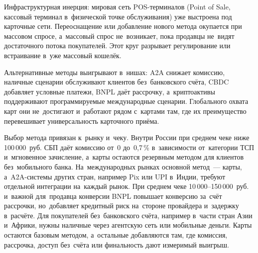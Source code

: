 Инфраструктурная инерция: мировая сеть POS-терминалов (Point of Sale, кассовый
терминал в~физической точке обслуживания) уже выстроена под карточные сети.
Переоснащение или добавление нового метода окупается при массовом спросе,
а~массовый спрос не~возникает, пока продавцы не~видят достаточного
потока покупателей. Этот круг разрывает регулирование или встраивание в~уже
массовый кошелёк.

Альтернативные методы выигрывают в~нишах: A2A снижает комиссию, наличные
сценарии обслуживают клиентов без~банковского счёта, CBDC добавляет условные
платежи, BNPL даёт рассрочку, а~криптоактивы поддерживают программируемые
международные сценарии. Глобального охвата карт они не~достигают и~работают
рядом с~картами там, где их преимущество перевешивает универсальность
карточного приёма.

Выбор метода привязан к~рынку и~чеку. Внутри России при среднем чеке ниже
100\,000~руб. СБП даёт комиссию от~0 до~0{,}7\,\% в~зависимости от~категории ТСП
и~мгновенное зачисление, а~карты остаются резервным методом для клиентов
без~мобильного банка. На~международных рынках основной метод~--- карты,
а~A2A-системы других стран, например Pix или UPI в~Индии, требуют отдельной
интеграции на~каждый рынок. При среднем чеке 10\,000--150\,000~руб.
и~важной для~продавца конверсии BNPL повышает конверсию за~счёт рассрочки,
но~добавляет кредитный риск на~стороне провайдера и~задержку в~расчёте. Для
покупателей без~банковского счёта, например в~части стран Азии и~Африки, нужны
наличные через агентскую сеть или мобильные деньги. Карты остаются базовым
методом, а~остальные добавляются там, где комиссия, рассрочка, доступ без~счёта
или финальность дают измеримый выигрыш.
